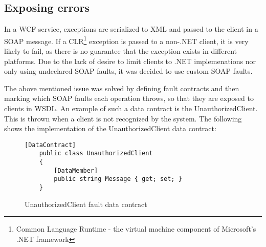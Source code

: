 \documentclass[../report.tex]{subfiles}
\begin{document}
\subsection{Exposing errors}
In a WCF service, exceptions are serialized to XML and passed to the client in a SOAP message. If a CLR\footnote{Common Language Runtime - the virtual machine component of Microsoft's .NET framework} exception is passed to a non-.NET client, it is very likely to fail, as there is no guarantee that the exception exists in different platforms. Due to the lack of desire to limit clients to .NET implemenations nor only using undeclared SOAP faults, it was decided to use custom SOAP faults.


The above mentioned issue was solved by defining fault contracts and then marking which SOAP faults each operation throws, so that they are exposed to clients in WSDL. An example of such a data contract is the UnauthorizedClient. This is thrown when a client is not recognized by the system. The following shows the implementation of the UnauthorizedClient data contract:


\begin{figure}[H]
\begin{lstlisting}[frame=single]
    [DataContract]
    public class UnauthorizedClient
    {
        [DataMember]
        public string Message { get; set; }
    }
\end{lstlisting}
\caption{UnauthorizedClient fault data contract}
\end{figure}


\end{document}

